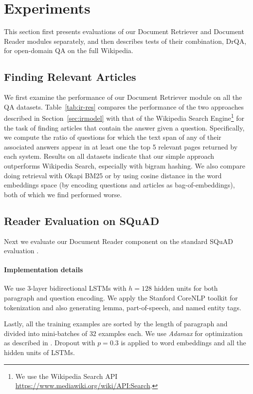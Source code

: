 \documentclass[11pt,a4paper]{article}
\newcommand\us{DrQA\xspace}
\newcommand\usr{Document Retriever\xspace}
\newcommand\usp{Document Reader\xspace}
\begin{document}
\section{Experiments} \label{sec:exp}

This section first presents evaluations of our Document Retriever and Document Reader modules separately, and then describes tests of their combination, \us, for open-domain QA on the full Wikipedia.

\subsection{Finding Relevant Articles}
We first examine the performance of our \usr module on all the QA datasets. Table~\ref{tab:ir-res} compares the performance of the two approaches described in Section~\ref{sec:irmodel} with that of the Wikipedia Search Engine\footnote{We use the Wikipedia Search API \url{https://www.mediawiki.org/wiki/API:Search}.} for the task of finding articles that contain the answer given a question.
Specifically, we compute the ratio of questions for which the text span of any of their associated answers appear in at least one the top 5 relevant pages returned by each system.
Results on all datasets indicate that our simple approach outperforms Wikipedia Search, especially with bigram hashing.
We also compare doing retrieval with Okapi BM25 or by using cosine distance in the word embeddings space (by encoding questions and articles as bag-of-embeddings), both of which we find performed worse.


\subsection{Reader Evaluation on SQuAD}
Next we evaluate our \usp component on the standard SQuAD evaluation \cite{rajpurkar2016squad}.
\paragraph{Implementation details}
We use $3$-layer bidirectional LSTMs with $h = 128$ hidden units for both paragraph and question encoding.
We apply the Stanford CoreNLP toolkit \cite{manning2014stanford} for tokenization and also generating lemma, part-of-speech, and named entity tags.

Lastly, all the training examples are sorted by the length of paragraph and divided into mini-batches of $32$ examples each. We use \emph{Adamax} for optimization as described in \cite{kingma2014adam}. Dropout with $p = 0.3$ is applied to word embeddings and all the hidden units of LSTMs.
\end{document}
